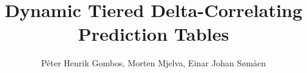 \documentclass[10pt]{IEEEtran}
\begin{document}
\author{Péter Henrik Gombos,
	Morten Mjelva,
	Einar Johan Sømåen}
\title{Dynamic Tiered Delta-Correlating Prediction Tables}

\maketitle








\end{document}
